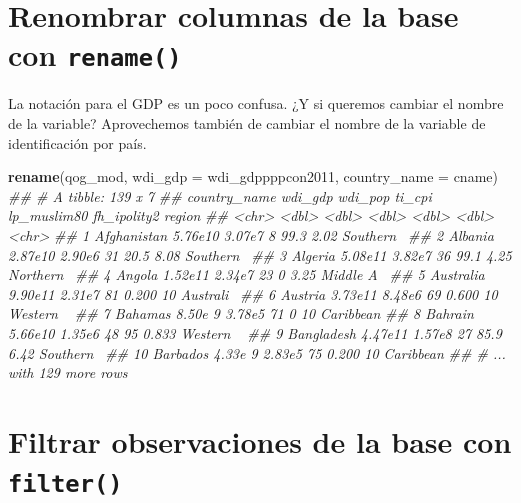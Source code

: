 \documentclass[]{book}
\newenvironment{Shaded}{\begin{snugshade}}{\end{snugshade}}
\newcommand{\CommentTok}[1]{\textcolor[rgb]{0.56,0.35,0.01}{\textit{#1}}}
\newcommand{\DataTypeTok}[1]{\textcolor[rgb]{0.13,0.29,0.53}{#1}}
\newcommand{\KeywordTok}[1]{\textcolor[rgb]{0.13,0.29,0.53}{\textbf{#1}}}
\newcommand{\NormalTok}[1]{#1}
\begin{document}
\hypertarget{renombrar-columnas-de-la-base-con-rename}{%
\section{\texorpdfstring{Renombrar columnas de la base con
\texttt{rename()}}{Renombrar columnas de la base con rename()}}\label{renombrar-columnas-de-la-base-con-rename}}

La notación para el GDP es un poco confusa. ¿Y si queremos cambiar el
nombre de la variable? Aprovechemos también de cambiar el nombre de la
variable de identificación por país.

\begin{Shaded}
\begin{Highlighting}[]
\KeywordTok{rename}\NormalTok{(qog_mod, }\DataTypeTok{wdi_gdp =}\NormalTok{ wdi_gdppppcon2011, }\DataTypeTok{country_name =}\NormalTok{ cname)}
\CommentTok{## # A tibble: 139 x 7}
\CommentTok{##    country_name  wdi_gdp  wdi_pop ti_cpi lp_muslim80 fh_ipolity2 region   }
\CommentTok{##    <chr>           <dbl>    <dbl>  <dbl>       <dbl>       <dbl> <chr>    }
\CommentTok{##  1 Afghanistan   5.76e10   3.07e7      8      99.3         2.02  Southern~}
\CommentTok{##  2 Albania       2.87e10   2.90e6     31      20.5         8.08  Southern~}
\CommentTok{##  3 Algeria       5.08e11   3.82e7     36      99.1         4.25  Northern~}
\CommentTok{##  4 Angola        1.52e11   2.34e7     23       0           3.25  Middle A~}
\CommentTok{##  5 Australia     9.90e11   2.31e7     81       0.200      10     Australi~}
\CommentTok{##  6 Austria       3.73e11   8.48e6     69       0.600      10     Western ~}
\CommentTok{##  7 Bahamas       8.50e 9   3.78e5     71       0          10     Caribbean}
\CommentTok{##  8 Bahrain       5.66e10   1.35e6     48      95           0.833 Western ~}
\CommentTok{##  9 Bangladesh    4.47e11   1.57e8     27      85.9         6.42  Southern~}
\CommentTok{## 10 Barbados      4.33e 9   2.83e5     75       0.200      10     Caribbean}
\CommentTok{## # ... with 129 more rows}
\end{Highlighting}
\end{Shaded}

\hypertarget{filtrar-observaciones-de-la-base-con-filter}{%
\section{\texorpdfstring{Filtrar observaciones de la base con
\texttt{filter()}}{Filtrar observaciones de la base con filter()}}\label{filtrar-observaciones-de-la-base-con-filter}}
\end{document}
